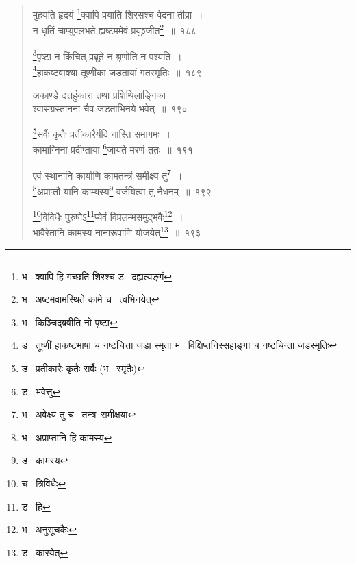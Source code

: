 \documentclass[11pt, openany]{book}
\makeatletter
\newcommand{\devanagarinumeral}[1]{%
	\devanagaridigits{\number \csname c@#1\endcsname}} %
\makeatother
\begin{document}
\cfoot{}
\fancyhead[LE,RO]{\thepage}
\renewcommand{\thepage}{\devanagarinumeral{page}}
\setcounter{page}{203}


\begin{quote}
{\na मुहयति हृदयं \renewcommand{\thefootnote}{1}\footnote{भ \textendash\ क्वापि हि गच्छति शिरश्च ड \textendash\  दह्यत्यङ्गं}क्वापि प्रयाति शिरसश्च वेदना तीव्रा~।\\
न धृतिं चाप्युपलभते ह्यष्टममेवं प्रयुञ्जीत\renewcommand{\thefootnote}{2}\footnote{भ \textendash\ अष्टमवामस्थिते कामे च \textendash\  त्वभिनयेत्}~॥~१८८

\renewcommand{\thefootnote}{3}\footnote{भ \textendash\  किञ्चिद्ब्रवीति नो पृष्टा}पृष्टा न किंचित् प्रब्रूते न श्रृणोति न पश्यति~।\\
\renewcommand{\thefootnote}{4}\footnote{ड \textendash\  तूष्णीं हाकष्टभाषा च नष्टचित्ता जडा स्मृता भ \textendash\  विक्षिप्तनिस्सहाङ्गा च नष्टचिन्ता जडस्मृतिः}हाकष्टवाक्या तूष्णीका जडतायां गतस्मृतिः~॥~१८९

अकाण्डे दत्तहुंकारा तथा प्रशिथिलाङ्गिका~।\\
श्वासग्रस्तानना चैव जडताभिनये भवेत्~॥~१९०

\renewcommand{\thefootnote}{5}\footnote{ड \textendash\  प्रतीकारैः कृतैः सर्वैः (भ \textendash\  स्मृतैः)}सर्वैः कृतैः प्रतीकारैर्यदि नास्ति समागमः~।\\
कामाग्निना प्रदीप्ताया \renewcommand{\thefootnote}{6}\footnote{ड \textendash\  भवेत्तु}जायते मरणं ततः~॥~१९१

एवं स्थानानि कार्याणि कामतन्त्रं समीक्ष्य तु\renewcommand{\thefootnote}{7}\footnote{भ \textendash\  अवेक्ष्य तु च \textendash\  तन्त्र\textendash\ समीक्षया}~।\\
\renewcommand{\thefootnote}{8}\footnote{भ \textendash\  अप्राप्तानि हि कामस्य}अप्राप्तौ यानि काम्यस्य\renewcommand{\thefootnote}{9}\footnote{ड \textendash\  कामस्य} वर्जयित्वा तु नैधनम्~॥~१९२

\renewcommand{\thefootnote}{10}\footnote{च \textendash\  त्रिविधैः}विविधैः पुरुषोऽ\renewcommand{\thefootnote}{11}\footnote{ड \textendash\  हि}प्येवं विप्रलम्भसमुद्भवैः\renewcommand{\thefootnote}{12}\footnote{भ \textendash\  अनुसूचकैः}~।\\
भावैरेतानि कामस्य नानारूपाणि योजयेत्\renewcommand{\thefootnote}{13}\footnote{ड \textendash\  कारयेत्}~॥~१९३}
\end{quote}

\hrule
\end{document}
